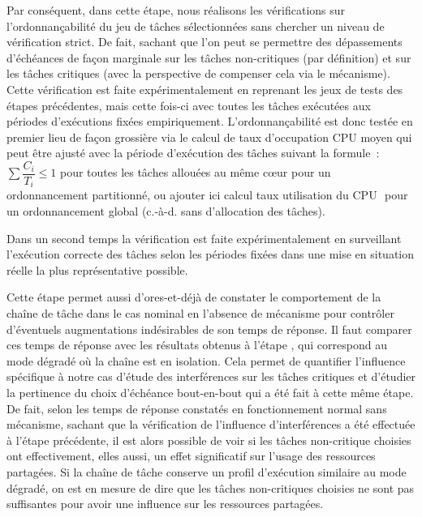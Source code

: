 \documentclass[french, a4paper, 11pt, twoside, pdftex]{StyleThese}
\begin{document}
		Par conséquent, dans cette étape, nous réalisons les vérifications sur l'ordonnançabilité du jeu de tâches sélectionnées sans chercher un niveau de vérification strict. De fait, sachant que l'on peut se permettre des dépassements d'échéances de façon marginale sur les tâches non-critiques (par définition) et sur les tâches critiques (avec la perspective de compenser cela via le mécanisme). Cette vérification est faite expérimentalement en reprenant les jeux de tests des étapes précédentes, mais cette fois-ci avec toutes les tâches exécutées aux périodes d'exécutions fixées empiriquement. L'ordonnançabilité est donc testée en premier lieu de façon grossière via le calcul de taux d'occupation CPU moyen qui peut être ajusté avec la période d'exécution des tâches suivant la formule~:	$ \sum{\dfrac{C_i}{T_i}} \leq 1 $ pour toutes les tâches allouées au même cœur pour un ordonnancement partitionné, ou \alert{ajouter ici calcul taux utilisation du CPU} $  $ pour un ordonnancement global (c.-à-d. sans d'allocation des tâches).
			
		Dans un second temps la vérification est faite expérimentalement en surveillant l'exécution correcte des tâches selon les périodes fixées dans une mise en situation réelle la plus représentative possible.
		 
		
		Cette étape permet aussi d'ores-et-déjà de constater le comportement de la chaîne de tâche dans le cas nominal en l'absence de mécanisme pour contrôler d'éventuels augmentations indésirables de son temps de réponse. Il faut comparer ces temps de réponse avec les résultats obtenus à l'étape , qui correspond au mode dégradé où la chaîne est en isolation. Cela permet de quantifier l'influence spécifique à notre cas d'étude des interférences sur les tâches critiques et d'étudier la pertinence du choix d'échéance bout-en-bout qui a été fait à cette même étape. De fait, selon les temps de réponse constatés en fonctionnement normal sans mécanisme, sachant que la vérification de l'influence d'interférences a été effectuée à l'étape précédente, il est alors possible de voir si les tâches non-critique choisies ont effectivement, elles aussi, un effet significatif sur l'usage des ressources partagées. Si la chaîne de tâche conserve un profil d'exécution similaire au mode dégradé, on est en mesure de dire que les tâches non-critiques choisies ne sont pas suffisantes pour avoir une influence sur les ressources partagées.
		
\end{document}
